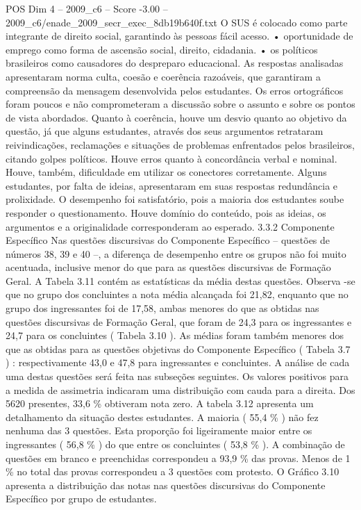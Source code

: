 \begin{textsample}{POS Dim 4 – 2009\_c6 – Score -3.00 – 2009\_c6/enade\_2009\_secr\_exec\_8db19b640f.txt}
O SUS é colocado como parte integrante de direito social, garantindo às pessoas fácil acesso. • oportunidade de emprego como forma de ascensão social, direito, cidadania. • os políticos brasileiros como causadores do despreparo educacional.
As respostas analisadas apresentaram norma culta, coesão e coerência razoáveis, que garantiram a compreensão da mensagem desenvolvida pelos estudantes.
Os erros ortográficos foram poucos e não comprometeram a discussão sobre o assunto e sobre os pontos de vista abordados.
Quanto à coerência, houve um desvio quanto ao objetivo da questão, já que alguns estudantes, através dos seus argumentos retrataram reivindicações, reclamações e situações de problemas enfrentados pelos brasileiros, citando golpes políticos.
Houve erros quanto à concordância verbal e nominal.
Houve, também, dificuldade em utilizar os conectores corretamente.
Alguns estudantes, por falta de ideias, apresentaram em suas respostas redundância e prolixidade.
O desempenho foi satisfatório, pois a maioria dos estudantes soube responder o questionamento.
Houve domínio do conteúdo, pois as ideias, os argumentos e a originalidade corresponderam ao esperado. 3.3.2 Componente Específico Nas questões discursivas do Componente Específico – questões de números 38, 39 e 40 –, a diferença de desempenho entre os grupos não foi muito acentuada, inclusive menor do que para as questões discursivas de Formação Geral.
A Tabela 3.11 contém as estatísticas da média destas questões.
Observa -se que no grupo dos concluintes a nota média alcançada foi 21,82, enquanto que no grupo dos ingressantes foi de 17,58, ambas menores do que as obtidas nas questões discursivas de Formação Geral, que foram de 24,3 para os ingressantes e 24,7 para os concluintes ( Tabela 3.10 ).
As médias foram também menores dos que as obtidas para as questões objetivas do Componente Específico ( Tabela 3.7 ) : respectivamente 43,0 e 47,8 para ingressantes e concluintes.
A análise de cada uma destas questões será feita nas subseções seguintes.
Os valores positivos para a medida de assimetria indicaram uma distribuição com cauda para a direita.
Dos 5620 presentes, 33,6 \% obtiveram nota zero.
A tabela 3.12 apresenta um detalhamento da situação destes estudantes.
A maioria ( 55,4 \% ) não fez nenhuma das 3 questões.
Esta proporção foi ligeiramente maior entre os ingressantes ( 56,8 \% ) do que entre os concluintes ( 53,8 \% ).
A combinação de questões em branco e preenchidas correspondeu a 93,9 \% das provas.
Menos de 1 \% no total das provas correspondeu a 3 questões com protesto.
O Gráfico 3.10 apresenta a distribuição das notas nas questões discursivas do Componente Específico por grupo de estudantes.

\end{textsample}
